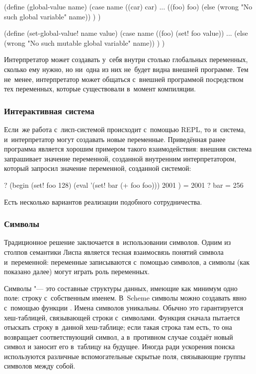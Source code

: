 \begin{code:lisp}
(define (global-value name)
  (case name
    ((car) car)
    ...
    ((foo) foo)
    (else (wrong "No such global variable" name)) ) )

(define (set-global-value! name value)
  (case name
    ((foo) (set! foo value))
    ...
    (else (wrong "No such mutable global variable" name)) ) )
\end{code:lisp}

Интерпретатор может создавать у~себя внутри столько глобальных переменных,
сколько ему нужно, но ни~одна из них не~будет видна внешней программе. Тем
не~менее, интерпретатор может общаться с~внешней программой посредством тех
переменных, которые существовали в~момент компиляции.


\subsubsection{Интерактивная система}%
\label{reflection/interpreted-eval/global/sssect:interactive}

Если~же работа с~лисп-системой происходит с~помощью REPL, то и~система,
и~интерпретатор могут создавать новые переменные. Приведённая ранее программа
является хорошим примером такого взаимодействия: внешняя система запрашивает
значение переменной, созданной внутренним интерпретатором, который запросил
значение переменной, созданной системой:

\begin{code:lisp}
? (begin (set! foo 128)
         (eval '(set! bar (+ foo foo)))
         2001 )
= 2001
? bar
= 256
\end{code:lisp}

Есть несколько вариантов реализации подобного сотрудничества.


\subsubsection{Символы}%
\label{reflection/interpreted-eval/global/sssect:symbols}

Традиционное решение заключается в~использовании символов. Одним из столпов
семантики Лиспа является тесная взаимосвязь понятий символа и~переменной:
переменные записываются с~помощью символов, а символы (как показано далее)
могут играть роль переменных.

Символы "--- это составные структуры данных, имеющие как минимум одно поле:
строку с~собственным именем. В~Scheme символы можно создавать явно с~помощью
функции . Имена символов уникальны. Обычно это гарантируется
хеш-таблицей, связывающей строки с~символами. Функция 
сначала пытается отыскать строку в~данной хеш-таблице; если такая строка там
есть, то она возвращает соответствующий символ, а в~противном случае
 создаёт новый символ и заносит его в~таблицу на будущее.
Иногда ради ускорения поиска используются различные вспомогательные скрытые
поля, связывающие группы символов между собой.

